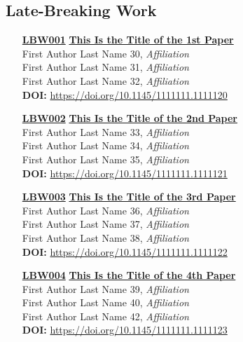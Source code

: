 \subsection{Late-Breaking Work}
\begin{enumerate}
\item[\href{https://doi.org/10.1145/1111111.1111120}{\textbf{LBW001}}]
\href{https://doi.org/10.1145/1111111.1111120}{\textbf{This Is the Title of the 1st Paper}}\\
First Author Last Name 30, \emph{Affiliation}\\
First Author Last Name 31, \emph{Affiliation}\\
First Author Last Name 32, \emph{Affiliation}\\
\textbf{DOI:} \href{https://doi.org/10.1145/1111111.1111120}{https://doi.org/10.1145/1111111.1111120}\\

\item[\href{https://doi.org/10.1145/1111111.1111121}{\textbf{LBW002}}]
\href{https://doi.org/10.1145/1111111.1111121}{\textbf{This Is the Title of the 2nd Paper}}\\
First Author Last Name 33, \emph{Affiliation}\\
First Author Last Name 34, \emph{Affiliation}\\
First Author Last Name 35, \emph{Affiliation}\\
\textbf{DOI:} \href{https://doi.org/10.1145/1111111.1111121}{https://doi.org/10.1145/1111111.1111121}\\

\item[\href{https://doi.org/10.1145/1111111.1111122}{\textbf{LBW003}}]
\href{https://doi.org/10.1145/1111111.1111122}{\textbf{This Is the Title of the 3rd Paper}}\\
First Author Last Name 36, \emph{Affiliation}\\
First Author Last Name 37, \emph{Affiliation}\\
First Author Last Name 38, \emph{Affiliation}\\
\textbf{DOI:} \href{https://doi.org/10.1145/1111111.1111122}{https://doi.org/10.1145/1111111.1111122}\\

\item[\href{https://doi.org/10.1145/1111111.1111123}{\textbf{LBW004}}]
\href{https://doi.org/10.1145/1111111.1111123}{\textbf{This Is the Title of the 4th Paper}}\\
First Author Last Name 39, \emph{Affiliation}\\
First Author Last Name 40, \emph{Affiliation}\\
First Author Last Name 42, \emph{Affiliation}\\
\textbf{DOI:} \href{https://doi.org/10.1145/1111111.1111123}{https://doi.org/10.1145/1111111.1111123}\\
\end{enumerate}


